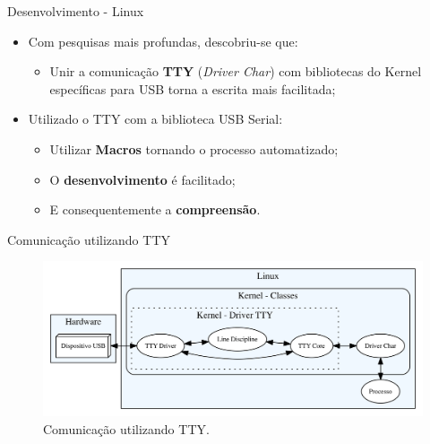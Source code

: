 	\begin{frame}{Desenvolvimento - Linux}
		\begin{itemize}
			\setlength\itemsep{2em}
			\item Com pesquisas mais profundas, descobriu-se que:
			\begin{itemize}
				\setlength\itemsep{1em}
				\item Unir a comunicação {\bf TTY} (\textit{Driver Char}) com bibliotecas do Kernel específicas para USB torna a escrita mais facilitada;
			\end{itemize}
			\item Utilizado o TTY com a biblioteca USB Serial:
			\begin{itemize}
				\setlength\itemsep{1em}
				\item Utilizar \textbf{Macros} tornando o processo automatizado;
				\item O \textbf{desenvolvimento} é facilitado;
				\item E consequentemente a \textbf{compreensão}.
			\end{itemize}
		\end{itemize}
	\end{frame}
	\begin{frame}{Comunicação utilizando TTY}
		\begin{figure}[p]
			\centering
			\includegraphics[width=1\textwidth]{img/tty.png}
			\caption{Comunicação utilizando TTY.}
			\label{fig:tty}
		\end{figure}
	\end{frame}


